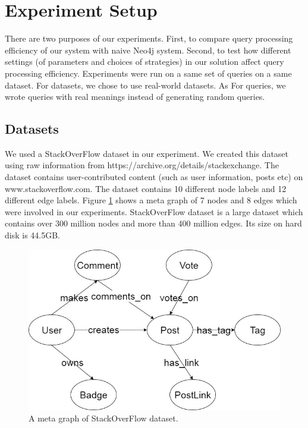 
\section{Experiment Setup}


There are two purposes of our experiments. First, to compare query processing efficiency of our system with naive Neo4j system. Second, to test how different settings (of parameters and choices of strategies) in our solution affect query processing efficiency. Experiments were run on a same set of queries on a same dataset. For datasets, we chose to use real-world datasets. As For queries, we wrote queries with real meanings instead of generating random queries. 

\subsection{Datasets}

We used a StackOverFlow dataset in our experiment. We created this dataset using raw information from https://archive.org/details/stackexchange. The dataset contains user-contributed content (such as user information, posts etc) on www.stackoverflow.com. The dataset contains 10 different node labels and 12 different edge labels.  Figure \ref{fig:5:1} shows a meta graph of 7 nodes and 8 edges which were involved in our experiments. StackOverFlow dataset is a large dataset which contains over 300 million nodes and more than 400 million edges. Its size on hard disk is 44.5GB. 

\begin{figure}[H]
	\centering
	\includegraphics[scale=0.5]{pic/MetaGraphExperiment (1).jpg}
	\caption{A meta graph of StackOverFlow dataset.}
	\label{fig:5:1}
\end{figure}  


